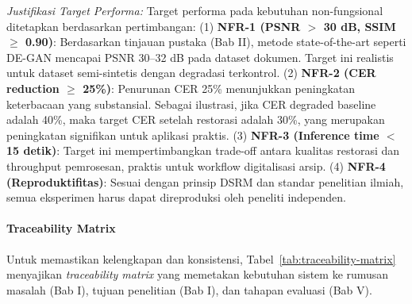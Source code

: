 \documentclass[12pt,a4paper]{book}
\begin{document}
\textit{Justifikasi Target Performa:} Target performa pada kebutuhan non-fungsional ditetapkan berdasarkan pertimbangan: (1) \textbf{NFR-1 (PSNR $>$ 30 dB, SSIM $\geq$ 0.90)}: Berdasarkan tinjauan pustaka (Bab II), metode state-of-the-art seperti DE-GAN mencapai PSNR 30--32 dB pada dataset dokumen. Target ini realistis untuk dataset semi-sintetis dengan degradasi terkontrol. (2) \textbf{NFR-2 (CER reduction $\geq$ 25\%)}: Penurunan CER 25\% menunjukkan peningkatan keterbacaan yang substansial. Sebagai ilustrasi, jika CER degraded baseline adalah 40\%, maka target CER setelah restorasi adalah 30\%, yang merupakan peningkatan signifikan untuk aplikasi praktis. (3) \textbf{NFR-3 (Inference time $<$ 15 detik)}: Target ini mempertimbangkan trade-off antara kualitas restorasi dan throughput pemrosesan, praktis untuk workflow digitalisasi arsip. (4) \textbf{NFR-4 (Reproduktifitas)}: Sesuai dengan prinsip DSRM dan standar penelitian ilmiah, semua eksperimen harus dapat direproduksi oleh peneliti independen.

\paragraph{Traceability Matrix}

Untuk memastikan kelengkapan dan konsistensi, Tabel~\ref{tab:traceability-matrix} menyajikan \textit{traceability matrix} yang memetakan kebutuhan sistem ke rumusan masalah (Bab I), tujuan penelitian (Bab I), dan tahapan evaluasi (Bab V).
\end{document}
